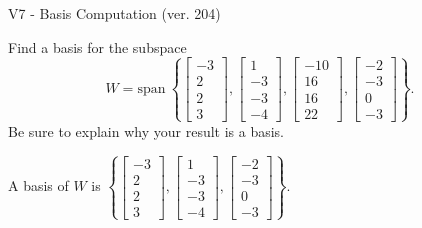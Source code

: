 \begin{exercise}
  \begin{exerciseTitle}V7 - Basis Computation (ver. 204)\end{exerciseTitle}
  \begin{exerciseStatement}
    Find a basis for the subspace 
\[W=\mathrm{span}\ \left\{\left[\begin{array}{r}
-3 \\
2 \\
2 \\
3
\end{array}\right] , \left[\begin{array}{r}
1 \\
-3 \\
-3 \\
-4
\end{array}\right] , \left[\begin{array}{r}
-10 \\
16 \\
16 \\
22
\end{array}\right] , \left[\begin{array}{r}
-2 \\
-3 \\
0 \\
-3
\end{array}\right]\right\}.\]
 Be sure to explain why your result is a basis.


  \end{exerciseStatement}
  \begin{exerciseAnswer}
   A basis of \(W\) is  \(\left\{\left[\begin{array}{r}
-3 \\
2 \\
2 \\
3
\end{array}\right] , \left[\begin{array}{r}
1 \\
-3 \\
-3 \\
-4
\end{array}\right] , \left[\begin{array}{r}
-2 \\
-3 \\
0 \\
-3
\end{array}\right]\right\}\).
  


  \end{exerciseAnswer}
\end{exercise}